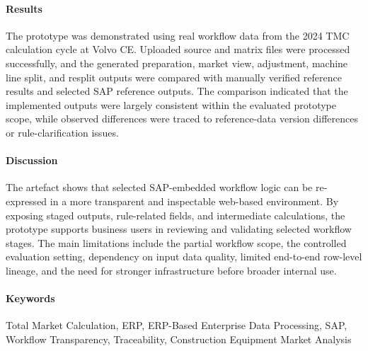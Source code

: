 \paragraph{Results} The prototype was demonstrated using real workflow data from the 2024 TMC calculation cycle at Volvo CE. Uploaded source and matrix files were processed successfully, and the generated preparation, market view, adjustment, machine line split, and resplit outputs were compared with manually verified reference results and selected SAP reference outputs. The comparison indicated that the implemented outputs were largely consistent within the evaluated prototype scope, while observed differences were traced to reference-data version differences or rule-clarification issues.

\paragraph{Discussion} The artefact shows that selected SAP-embedded workflow logic can be re-expressed in a more transparent and inspectable web-based environment. By exposing staged outputs, rule-related fields, and intermediate calculations, the prototype supports business users in reviewing and validating selected workflow stages. The main limitations include the partial workflow scope, the controlled evaluation setting, dependency on input data quality, limited end-to-end row-level lineage, and the need for stronger infrastructure before broader internal use.


\paragraph{Keywords} Total Market Calculation, ERP, ERP-Based Enterprise Data Processing, SAP, Workflow Transparency, Traceability, Construction Equipment Market Analysis








